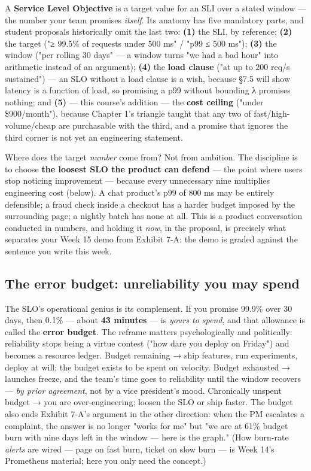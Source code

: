 A \textbf{Service Level Objective} is a target value for an SLI over a stated window — the number your team promises \textit{itself}. Its anatomy has five mandatory parts, and student proposals historically omit the last two: \textbf{(1)} the SLI, by reference; \textbf{(2)} the target ("≥ 99.5\% of requests under 500 ms" / "p99 ≤ 500 ms"); \textbf{(3)} the window ("per rolling 30 days" — a window turns "we had a bad hour" into arithmetic instead of an argument); \textbf{(4)} the \textbf{load clause} ("at up to 200 req/s sustained") — an SLO without a load clause is a wish, because §7.5 will show latency is a function of load, so promising a p99 without bounding λ promises nothing; and \textbf{(5)} — this course's addition — the \textbf{cost ceiling} ("under \$900/month"), because Chapter 1's triangle taught that any two of fast/high-volume/cheap are purchasable with the third, and a promise that ignores the third corner is not yet an engineering statement.

Where does the target \textit{number} come from? Not from ambition. The discipline is to choose \textbf{the loosest SLO the product can defend} — the point where users stop noticing improvement — because every unnecessary nine multiplies engineering cost (below). A chat product's p99 of 800 ms may be entirely defensible; a fraud check inside a checkout has a harder budget imposed by the surrounding page; a nightly batch has none at all. This is a product conversation conducted in numbers, and holding it \textit{now}, in the proposal, is precisely what separates your Week 15 demo from Exhibit 7-A: the demo is graded against the sentence you write this week.

\subsection*{The error budget: unreliability you may spend}

The SLO's operational genius is its complement. If you promise 99.9\% over 30 days, then 0.1\% — about \textbf{43 minutes} — is \textit{yours to spend}, and that allowance is called the \textbf{error budget}. The reframe matters psychologically and politically: reliability stops being a virtue contest ("how dare you deploy on Friday") and becomes a resource ledger. Budget remaining → ship features, run experiments, deploy at will; the budget exists to be spent on velocity. Budget exhausted → launches freeze, and the team's time goes to reliability until the window recovers — \textit{by prior agreement}, not by a vice president's mood. Chronically unspent budget → you are over-engineering; loosen the SLO or ship faster. The budget also ends Exhibit 7-A's argument in the other direction: when the PM escalates a complaint, the answer is no longer "works for me" but "we are at 61\% budget burn with nine days left in the window — here is the graph." (How burn-rate \textit{alerts} are wired — page on fast burn, ticket on slow burn — is Week 14's Prometheus material; here you only need the concept.)

